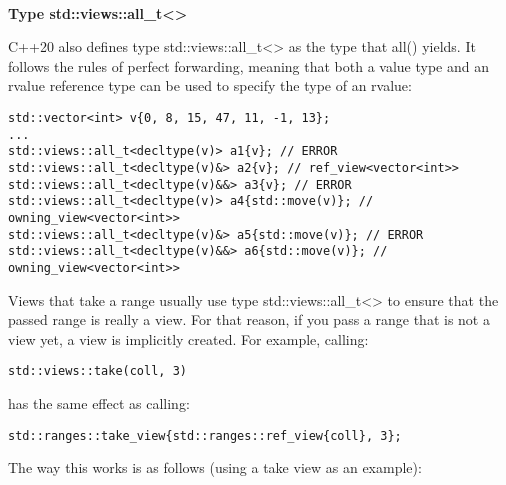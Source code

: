 \noindent
\hspace*{\fill} \\ %
\textbf{Type std::views::all\_t<>}

C++20 also defines type std::views::all\_t<> as the type that all() yields. It follows the rules of perfect forwarding, meaning that both a value type and an rvalue reference type can be used to specify the type of an rvalue:

\begin{lstlisting}[style=styleCXX]
std::vector<int> v{0, 8, 15, 47, 11, -1, 13};
...
std::views::all_t<decltype(v)> a1{v}; // ERROR
std::views::all_t<decltype(v)&> a2{v}; // ref_view<vector<int>>
std::views::all_t<decltype(v)&&> a3{v}; // ERROR
std::views::all_t<decltype(v)> a4{std::move(v)}; // owning_view<vector<int>>
std::views::all_t<decltype(v)&> a5{std::move(v)}; // ERROR
std::views::all_t<decltype(v)&&> a6{std::move(v)}; // owning_view<vector<int>>
\end{lstlisting}

Views that take a range usually use type std::views::all\_t<> to ensure that the passed range is really a view. For that reason, if you pass a range that is not a view yet, a view is implicitly created. For example, calling:

\begin{lstlisting}[style=styleCXX]
std::views::take(coll, 3)
\end{lstlisting}

has the same effect as calling:

\begin{lstlisting}[style=styleCXX]
std::ranges::take_view{std::ranges::ref_view{coll}, 3};
\end{lstlisting}

The way this works is as follows (using a take view as an example):

